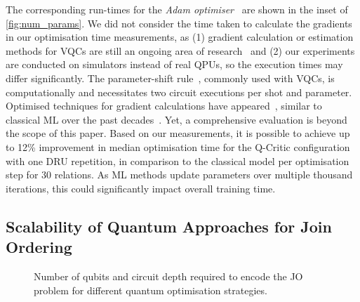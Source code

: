 \documentclass[10pt, conference]{IEEEtran}
\begin{document}
The corresponding run-times for the \emph{Adam optimiser}~\cite{kingma17} are shown in the inset of \autoref{fig:num_params}.
We did not consider the time taken to calculate the gradients in our optimisation time measurements, as (1) gradient calculation or estimation methods for VQCs are still an ongoing area of research~\cite{schuld18, wierichs22, gilyen19} and (2) our experiments are conducted on simulators instead of real QPUs, so the execution times may differ significantly.
The parameter-shift rule~\cite{schuld18}, commonly used with VQCs, is computationally and necessitates two circuit executions per shot and parameter. Optimised techniques for gradient calculations have appeared~\cite{periyasamy:2024,Stokes_2020,bittel2022fast,Spall92},
similar to classical ML over the past decades~\cite{sarker21}. Yet, a comprehensive
evaluation is beyond the scope of this paper.
Based on our measurements, it is possible to achieve up to 12\% improvement in median optimisation time for the Q-Critic configuration with one DRU repetition, in comparison to the classical model per optimisation step for 30 relations.
As ML methods update parameters over multiple thousand iterations, this could significantly impact overall training time.

\subsection{Scalability of Quantum Approaches for Join Ordering}
\label{sec:scalability}

\begin{figure}[htbp]
  \vspace*{-2em}
  \caption{Number of qubits and circuit depth required to encode the JO problem for different quantum optimisation strategies.}
  \label{fig:num_qubits}
\end{figure}
\end{document}
